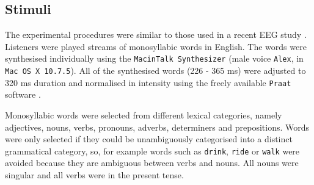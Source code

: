 \documentclass[10pt,letterpaper]{article}
\newcommand{\citet}[1]{\cite{#1}}
\begin{document}
\subsection*{Stimuli}

The experimental procedures were similar to those used in a recent EEG
study \cite{DingEtAl2017}. Listeners were played streams of
monosyllabic words in English. The words were synthesised individually
using the \texttt{MacinTalk Synthesizer} (male voice \texttt{Alex}, in
\texttt{Mac OS X 10.7.5}). All of the synthesised words (226 - 365 ms)
were adjusted to 320 ms duration and normalised in intensity using the
freely available \texttt{Praat} software \citet{Praat}.

Monosyllabic words were selected from different lexical categories,
namely adjectives, nouns, verbs, pronouns, adverbs, determiners and
prepositions. Words were only selected if they could be unambiguously
categorised into a distinct grammatical category, so, for example
words such as \texttt{drink}, \texttt{ride} or \texttt{walk} were
avoided because they are ambiguous between verbs and nouns. All nouns
were singular and all verbs were in the present tense.
\end{document}
